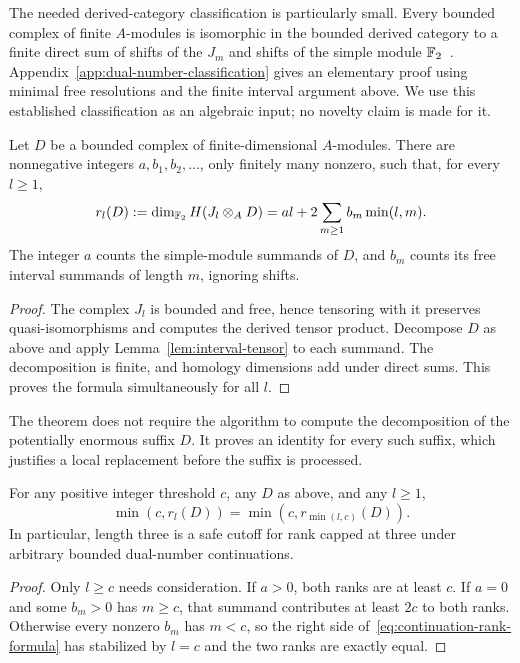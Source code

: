 The needed derived-category classification is particularly small. Every
bounded complex of finite $A$-modules is isomorphic in the bounded
derived category to a finite direct sum of shifts of the $J_m$ and shifts
of the simple module $\mathbb F_2$~\cite[Example 3.7(b)]{keller}.
Appendix~\ref{app:dual-number-classification} gives an elementary proof
using minimal free resolutions and the finite interval argument above.
We use this established classification as an algebraic input; no novelty
claim is made for it.

\begin{theorem}\label{thm:rank-formula}
Let $D$ be a bounded complex of finite-dimensional $A$-modules. There are
nonnegative integers $a,b_1,b_2,\ldots$, only finitely many nonzero, such
that, for every $l\ge1$,
\begin{equation}\label{eq:continuation-rank-formula}
 r_l(D):=\dim_{\mathbb F_2}H(J_l\otimes_A D)
   =a l+2\sum_{m\ge1}b_m\min(l,m).
\end{equation}
The integer $a$ counts the simple-module summands of $D$, and $b_m$
counts its free interval summands of length $m$, ignoring shifts.
\end{theorem}

\begin{proof}
The complex $J_l$ is bounded and free, hence tensoring with it preserves
quasi-isomorphisms and computes the derived tensor product. Decompose
$D$ as above and apply Lemma~\ref{lem:interval-tensor} to each summand.
The decomposition is finite, and homology dimensions add under direct
sums. This proves the formula simultaneously for all $l$.
\end{proof}

The theorem does not require the algorithm to compute the decomposition
of the potentially enormous suffix $D$. It proves an identity for every
such suffix, which justifies a local replacement before the suffix is
processed.

\begin{corollary}\label{cor:universal-cutoff}
For any positive integer threshold $c$, any $D$ as above, and any $l\ge1$,
\[
 \min(c,r_l(D))=\min(c,r_{\min(l,c)}(D)).
\]
In particular, length three is a safe cutoff for rank capped at three
under arbitrary bounded dual-number continuations.
\end{corollary}

\begin{proof}
Only $l\ge c$ needs consideration. If $a>0$, both ranks are at least
$c$. If $a=0$ and some $b_m>0$ has $m\ge c$, that summand contributes
at least $2c$ to both ranks. Otherwise every nonzero $b_m$ has $m<c$,
so the right side of~\eqref{eq:continuation-rank-formula} has stabilized
by $l=c$ and the two ranks are exactly equal.
\end{proof}

